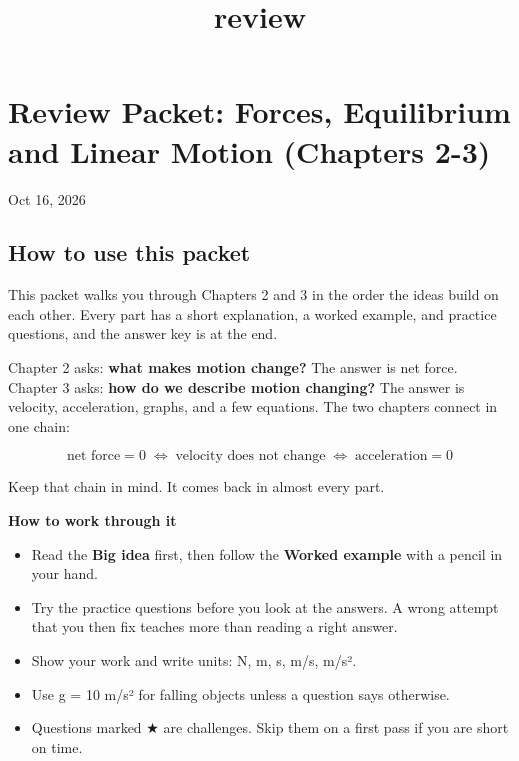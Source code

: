 \documentclass[
]{article}
\title{review}
\author{}
\date{\vspace{-2.5em}}
\providecommand{\tightlist}{%
  \setlength{\itemsep}{0pt}\setlength{\parskip}{0pt}}
\begin{document}
\maketitle

\section{Review Packet: Forces, Equilibrium and Linear Motion (Chapters
2-3)}\label{review-packet-forces-equilibrium-and-linear-motion-chapters-2-3}

Oct 16, 2026

\subsection{How to use this packet}\label{how-to-use-this-packet}

This packet walks you through Chapters 2 and 3 in the order the ideas
build on each other. Every part has a short explanation, a worked
example, and practice questions, and the answer key is at the end.

Chapter 2 asks: \textbf{what makes motion change?} The answer is net
force. Chapter 3 asks: \textbf{how do we describe motion changing?} The
answer is velocity, acceleration, graphs, and a few equations. The two
chapters connect in one chain:

\[
\text{net force} = 0 \;\Longleftrightarrow\; \text{velocity does not change} \;\Longleftrightarrow\; \text{acceleration} = 0
\]

Keep that chain in mind. It comes back in almost every part.

\textbf{How to work through it}

\begin{itemize}
\tightlist
\item
  Read the \textbf{Big idea} first, then follow the \textbf{Worked
  example} with a pencil in your hand.
\item
  Try the practice questions before you look at the answers. A wrong
  attempt that you then fix teaches more than reading a right answer.
\item
  Show your work and write units: N, m, s, m/s, m/s².
\item
  Use g = 10 m/s² for falling objects unless a question says otherwise.
\item
  Questions marked ★ are challenges. Skip them on a first pass if you
  are short on time.
\end{itemize}
\end{document}
